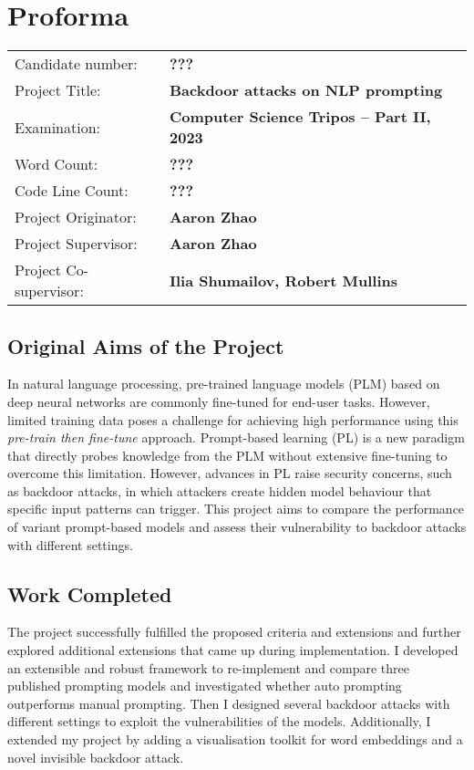 \documentclass[12pt,a4paper,twoside,openright]{report}
\begin{document}
\chapter*{Proforma}
 {\large
  \begin{tabular}{ll}
	  Candidate number:   & \bf ???                                      \\
	  Project Title:      & \bf Backdoor attacks on NLP prompting        \\
	  Examination:        & \bf Computer Science Tripos -- Part II, 2023 \\
	  Word Count:         & \bf ??? \footnotemark[1]                     \\
	  Code Line Count:    & \bf ??? \footnotemark[2]                     \\
	  Project Originator: & \bf Aaron Zhao                  \\
	  Project Supervisor: & \bf Aaron Zhao                       \\
	  Project Co-supervisor: & \bf Ilia Shumailov, Robert Mullins \\
  \end{tabular}
 }

\section*{Original Aims of the Project}
In natural language processing, pre-trained language models (PLM) based on deep neural networks are commonly fine-tuned for end-user tasks. However, limited training data poses a challenge for achieving high performance using this \emph{pre-train then fine-tune} approach. Prompt-based learning (PL) is a new paradigm that directly probes knowledge from the PLM without extensive fine-tuning to overcome this limitation. However, advances in PL raise security concerns, such as backdoor attacks, in which attackers create hidden model behaviour that specific input patterns can trigger. This project aims to compare the performance of variant prompt-based models and assess their vulnerability to backdoor attacks with different settings.

\section*{Work Completed}
The project successfully fulfilled the proposed criteria and extensions and further explored additional extensions that came up during implementation. I developed an extensible and robust framework to re-implement and compare three published prompting models and investigated whether auto prompting outperforms manual prompting. Then I designed several backdoor attacks with different settings to exploit the vulnerabilities of the models. Additionally, I extended my project by adding a visualisation toolkit for word embeddings and a novel invisible backdoor attack.
\end{document}
